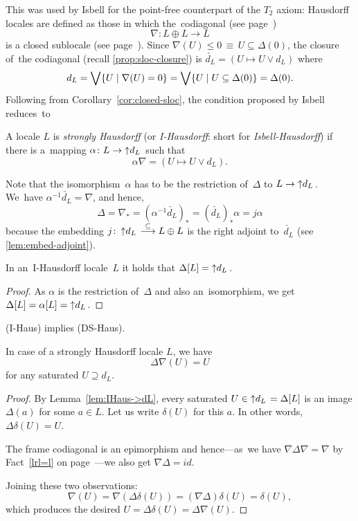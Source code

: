 This was used by Isbell \cite{isbell72} for the point-free counterpart of the
$T_2$ axiom:
Hausdorff locales are defined as those in which the~codiagonal (see
page~\pageref{codiag-in-Frm})
\[
  \nabla\colon L \oplus L \to L
\]
is a closed sublocale (see page~\pageref{df:closed-sloc}).
Since $\nabla(U) \le 0 \, \equiv \, U \subseteq \Delta(0)$, the closure of~the
codiagonal (recall \ref{prop:sloc-closure}) is $\check{d_L} = (U
\mapsto U \vee d_L)$ where
\[
  d_L
  = \bigvee \{ U \mid \nabla(U) = 0 \}
  = \bigvee \{ U \mid U \subseteq \Delta(0) \}
  = \Delta(0).
\]
Following from Corollary~\ref{cor:closed-sloc}, the condition proposed by
Isbell reduces~to

\begin{framed}
  \begin{df}[I-Haus]
    A locale $L$ is \emph{strongly Hausdorff\/} (or \emph{I-Hausdorff}: short
    for \emph{Isbell-Hausdorff}) if there is a~mapping $\alpha\colon L \to
    \left\uparrow d_L \right.$ such that
    \[
      \alpha \nabla = (U \mapsto U \vee d_L).
    \]
  \end{df}
\end{framed}

Note that the isomorphism~$\alpha$ has to be the restriction of~$\Delta$ to $L
\to \left\uparrow d_L \right.$.
We~have $\alpha^{-1} \check{d_L} = \nabla$, and hence,
\[
\Delta
= \nabla_*
= (\alpha^{-1} \check{d_L})_*
= (\check{d_L})_* \alpha
= j \alpha
\]
because the embedding $j\colon \dL \embed L \oplus L$ is the right adjoint
to~$\check{d_L}$ (see \ref{lem:embed-adjoint}).

\begin{lem} \label{lem:IHaus->dL}
  In an~I-Hausdorff locale~$L$ it holds that $\Delta[L] = \left\uparrow d_L \right.$.
\end{lem}
\begin{proof}
  As $\alpha$ is the restriction of~$\Delta$ and also an~isomorphism, we get
  $\Delta[L] = \alpha[L] = \left\uparrow d_L \right.$.
\end{proof}

\begin{thm} \label{IHaus->DSHaus}
  (I-Haus) implies (DS-Haus).
\end{thm}

\begin{lem} \label{lem:delta-nabla=id}
  In case of a strongly Hausdorff locale $L$, we have
  \[
    \Delta\nabla(U) = U
  \]
  for any saturated $U \supseteq d_L$.
\end{lem}
\begin{proof}
  By Lemma~\ref{lem:IHaus->dL}, every saturated $U\in \left\uparrow d_L \right. = \Delta[L]$ is an
  image $\Delta(a)$ for some $a\in L$.
  Let us write $\delta(U)$ for this $a$.
  In other words, $\Delta\delta(U) = U$.

  The frame codiagonal is an epimorphism and hence---as~we have $\nabla \Delta
  \nabla = \nabla$ by Fact~\ref{lrl=l} on page~\pageref{lrl=l}---we also get
  $\nabla \Delta = id$.

  Joining these two observations:
  \[
    \nabla (U) = \nabla (\Delta\delta (U)) = (\nabla \Delta)\delta (U) =
    \delta(U),
  \]
  which produces the desired $U = \Delta \delta (U) = \Delta \nabla (U)$.
\end{proof}


